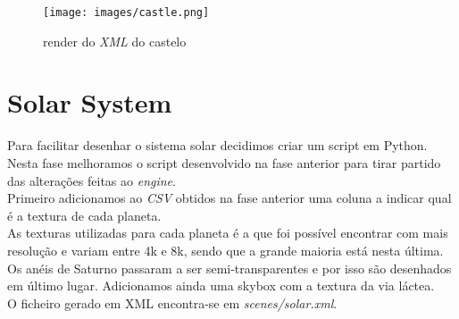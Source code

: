 \documentclass[a4paper]{report}
\begin{document}
\begin{figure}[H]
    \centering 
    \texttt{[image: images/castle.png]}  
    \caption{render do \textit{XML} do castelo}
\end{figure}

\section{Solar System}
Para facilitar desenhar o sistema solar decidimos criar um script em Python.\\
Nesta fase melhoramos o script desenvolvido na fase anterior para tirar partido
das alterações feitas ao \textit{engine}.\\
Primeiro adicionamos ao \textit{CSV} obtidos na fase anterior  uma coluna a
indicar qual é a textura de cada planeta.\\
As texturas utilizadas para cada planeta é a que foi possível encontrar com mais
resolução e variam entre 4k e 8k, sendo que a grande maioria está nesta
última.\\
Os anéis de Saturno passaram a ser semi-transparentes e por isso são desenhados
em último lugar.
Adicionamos ainda uma skybox com a textura da via láctea.\\
O ficheiro gerado em XML encontra-se em \textit{scenes/solar.xml}.
\end{document}
